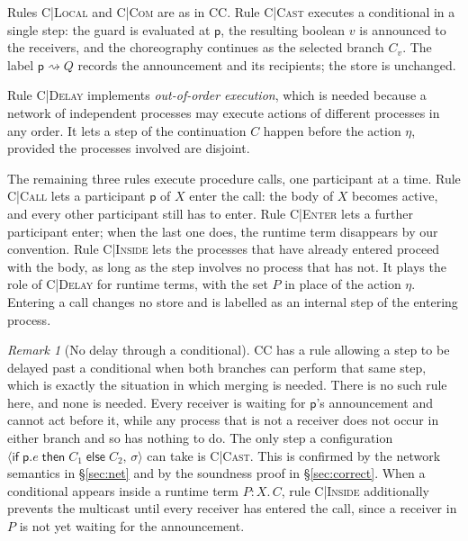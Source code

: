 \documentclass[11pt]{article}
\theoremstyle{plain}
\theoremstyle{definition}
\theoremstyle{remark}
\newtheorem{remark}[theorem]{Remark}
\newcommand{\kw}[1]{\mathsf{#1}}
\newcommand{\kif}{\kw{if}\;}
\newcommand{\kthen}{\;\kw{then}\;}
\newcommand{\kelse}{\;\kw{else}\;}
\newcommand{\pp}{\mathsf{p}}
\newcommand{\conf}[2]{\langle #1,\, #2\rangle}
\newcommand{\cast}[2]{#1 \rightsquigarrow #2}
\newcommand{\rn}[1]{{\normalfont\scshape #1}}
\newcommand{\ifcond}[3]{\kif #1 \kthen #2 \kelse #3}
\newcommand{\rt}[3]{#1\mathbin{:}#2.\,#3}
\begin{document}
Rules \rn{C|Local} and \rn{C|Com} are as in CC.  Rule \rn{C|Cast} executes a
conditional in a single step: the guard is evaluated at $\pp$, the resulting
boolean $v$ is announced to the receivers, and the choreography continues as
the selected branch $C_v$.  The label $\cast{\pp}{Q}$ records the announcement
and its recipients; the store is unchanged.

Rule \rn{C|Delay} implements \emph{out-of-order execution}, which is needed
because a network of independent processes may execute actions of different
processes in any order.  It lets a step of the continuation $C$ happen before
the action $\eta$, provided the processes involved are disjoint.

The remaining three rules execute procedure calls, one participant at a
time.  Rule \rn{C|Call} lets a participant $\pp$ of $X$ enter the call: the
body of $X$ becomes active, and every other participant still has to enter.
Rule \rn{C|Enter} lets a further participant enter; when the last one does,
the runtime term disappears by our convention.  Rule \rn{C|Inside} lets the
processes that have already entered proceed with the body, as long as the
step involves no process that has not.  It plays the role of \rn{C|Delay} for
runtime terms, with the set $P$ in place of the action $\eta$.  Entering a
call changes no store and is labelled as an internal step of the entering
process.

\begin{remark}[No delay through a conditional]\label{rem:no-delay-cond}
  CC has a rule allowing a step to be delayed past a conditional when both
  branches can perform that same step, which is exactly the situation in
  which merging is needed.  There is no such rule here, and none is needed.
  Every receiver is waiting for $\pp$'s announcement and cannot act before
  it, while any process that is not a receiver does not occur in either branch
  and so has nothing to do.  The only step a configuration
  $\conf{\ifcond{\pp.e}{C_1}{C_2}}{\sigma}$ can take is \rn{C|Cast}.  This is
  confirmed by the network semantics in \S\ref{sec:net} and by the soundness
  proof in \S\ref{sec:correct}.  When a conditional appears inside a runtime
  term $\rt{P}{X}{C}$, rule \rn{C|Inside} additionally prevents the multicast
  until every receiver has entered the call, since a receiver in $P$ is not
  yet waiting for the announcement.
\end{remark}
\end{document}
